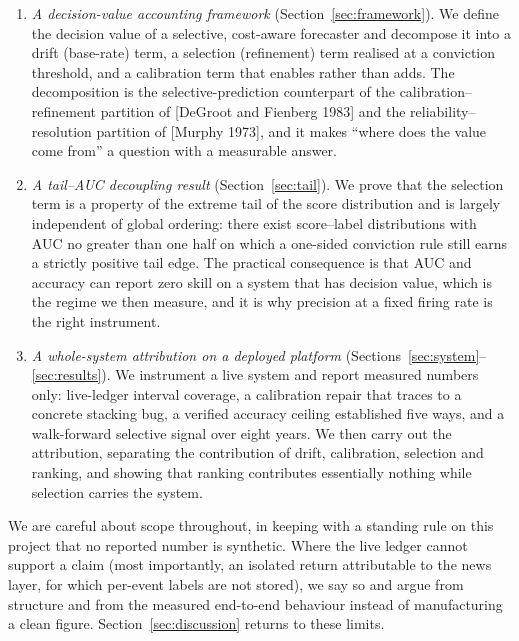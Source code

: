 \documentclass[10pt, a4paper, oneside]{article}
\theoremstyle{definition}
\theoremstyle{plain}
\begin{document}
\begin{enumerate}[leftmargin=1.4em,itemsep=2pt,topsep=2pt]
\item \emph{A decision-value accounting framework} (Section~\ref{sec:framework}).
We define the decision value of a selective, cost-aware forecaster and decompose it
into a drift (base-rate) term, a selection (refinement) term realised at a
conviction threshold, and a calibration term that enables rather than adds. The
decomposition is the selective-prediction counterpart of the calibration--refinement
partition of [DeGroot and Fienberg 1983] and the reliability--resolution partition
of [Murphy 1973], and it makes ``where does the value come from'' a question with a
measurable answer.
\item \emph{A tail--AUC decoupling result} (Section~\ref{sec:tail}). We prove that
the selection term is a property of the extreme tail of the score distribution and
is largely independent of global ordering: there exist score--label distributions
with AUC no greater than one half on which a one-sided conviction rule still earns a
strictly positive tail edge. The practical consequence is that AUC and accuracy can
report zero skill on a system that has decision value, which is the regime we
then measure, and it is why precision at a fixed firing rate is the right instrument.
\item \emph{A whole-system attribution on a deployed platform}
(Sections~\ref{sec:system}--\ref{sec:results}). We instrument a live system and
report measured numbers only: live-ledger interval coverage, a calibration repair
that traces to a concrete stacking bug, a verified accuracy ceiling established five
ways, and a walk-forward selective signal over eight years. We then carry out the
attribution, separating the contribution of drift, calibration, selection and
ranking, and showing that ranking contributes essentially nothing while selection
carries the system.
\end{enumerate}

We are careful about scope throughout, in keeping with a standing
rule on this project that no reported number is synthetic. Where the live ledger
cannot support a claim (most importantly, an isolated return attributable to the
news layer, for which per-event labels are not stored), we say so and argue from
structure and from the measured end-to-end behaviour instead of manufacturing a
clean figure. Section~\ref{sec:discussion} returns to these limits.

\end{document}
